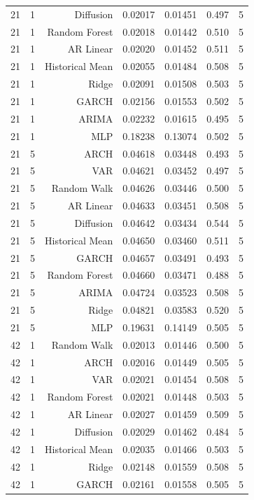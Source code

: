 \begin{table}[!htbp]
\begin{tabular}{lrrrrrr}
21 & 1 & Diffusion & 0.02017 & 0.01451 & 0.497 & 5 \\
21 & 1 & Random Forest & 0.02018 & 0.01442 & 0.510 & 5 \\
21 & 1 & AR Linear & 0.02020 & 0.01452 & 0.511 & 5 \\
21 & 1 & Historical Mean & 0.02055 & 0.01484 & 0.508 & 5 \\
21 & 1 & Ridge & 0.02091 & 0.01508 & 0.503 & 5 \\
21 & 1 & GARCH & 0.02156 & 0.01553 & 0.502 & 5 \\
21 & 1 & ARIMA & 0.02232 & 0.01615 & 0.495 & 5 \\
21 & 1 & MLP & 0.18238 & 0.13074 & 0.502 & 5 \\
21 & 5 & ARCH & 0.04618 & 0.03448 & 0.493 & 5 \\
21 & 5 & VAR & 0.04621 & 0.03452 & 0.497 & 5 \\
21 & 5 & Random Walk & 0.04626 & 0.03446 & 0.500 & 5 \\
21 & 5 & AR Linear & 0.04633 & 0.03451 & 0.508 & 5 \\
21 & 5 & Diffusion & 0.04642 & 0.03434 & 0.544 & 5 \\
21 & 5 & Historical Mean & 0.04650 & 0.03460 & 0.511 & 5 \\
21 & 5 & GARCH & 0.04657 & 0.03491 & 0.493 & 5 \\
21 & 5 & Random Forest & 0.04660 & 0.03471 & 0.488 & 5 \\
21 & 5 & ARIMA & 0.04724 & 0.03523 & 0.508 & 5 \\
21 & 5 & Ridge & 0.04821 & 0.03583 & 0.520 & 5 \\
21 & 5 & MLP & 0.19631 & 0.14149 & 0.505 & 5 \\
42 & 1 & Random Walk & 0.02013 & 0.01446 & 0.500 & 5 \\
42 & 1 & ARCH & 0.02016 & 0.01449 & 0.505 & 5 \\
42 & 1 & VAR & 0.02021 & 0.01454 & 0.508 & 5 \\
42 & 1 & Random Forest & 0.02021 & 0.01448 & 0.503 & 5 \\
42 & 1 & AR Linear & 0.02027 & 0.01459 & 0.509 & 5 \\
42 & 1 & Diffusion & 0.02029 & 0.01462 & 0.484 & 5 \\
42 & 1 & Historical Mean & 0.02035 & 0.01466 & 0.503 & 5 \\
42 & 1 & Ridge & 0.02148 & 0.01559 & 0.508 & 5 \\
42 & 1 & GARCH & 0.02161 & 0.01558 & 0.505 & 5 \\

\end{tabular}
\end{table}
